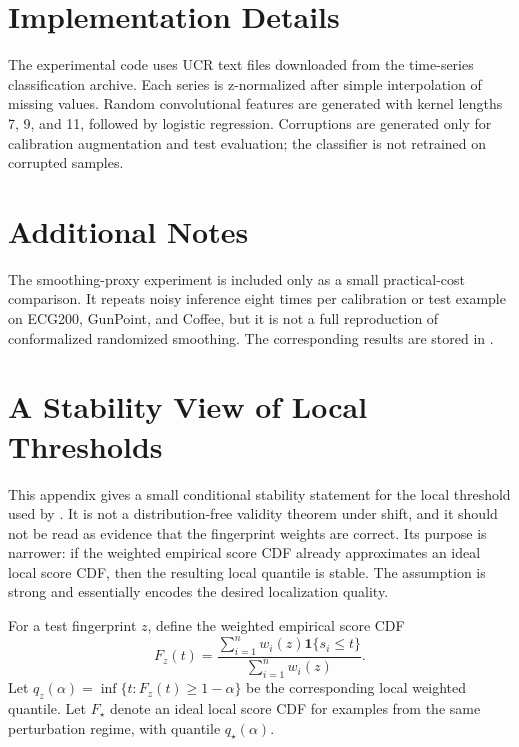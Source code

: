 \section{Implementation Details}

The experimental code uses UCR text files downloaded from the time-series classification archive. Each series is z-normalized after simple interpolation of missing values. Random convolutional features are generated with kernel lengths 7, 9, and 11, followed by logistic regression. Corruptions are generated only for calibration augmentation and test evaluation; the classifier is not retrained on corrupted samples.

\section{Additional Notes}

The smoothing-proxy experiment is included only as a small practical-cost comparison. It repeats noisy inference eight times per calibration or test example on ECG200, GunPoint, and Coffee, but it is not a full reproduction of conformalized randomized smoothing. The corresponding results are stored in .

\section{A Stability View of Local Thresholds}

This appendix gives a small conditional stability statement for the local threshold used by \fastcp. It is not a distribution-free validity theorem under shift, and it should not be read as evidence that the fingerprint weights are correct. Its purpose is narrower: if the weighted empirical score CDF already approximates an ideal local score CDF, then the resulting local quantile is stable. The assumption is strong and essentially encodes the desired localization quality.

For a test fingerprint $z$, define the weighted empirical score CDF
\begin{equation}
    F_z(t)=
    \frac{\sum_{i=1}^n w_i(z)\mathbf{1}\{s_i\le t\}}
    {\sum_{i=1}^n w_i(z)}.
\end{equation}
Let $q_z(\alpha)=\inf\{t:F_z(t)\ge 1-\alpha\}$ be the corresponding local weighted quantile. Let $F_\star$ denote an ideal local score CDF for examples from the same perturbation regime, with quantile $q_\star(\alpha)$.

